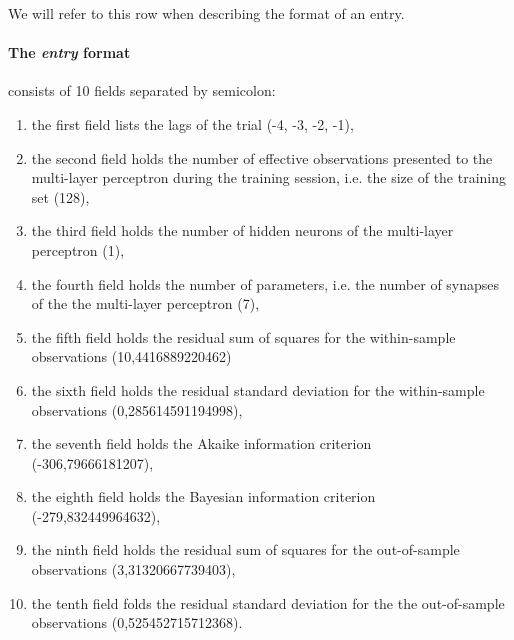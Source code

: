 \medskip

We will refer to this row when describing the format of an entry.

\paragraph{The \textit{entry} format} consists of 10 fields separated by semicolon:
\begin{enumerate}
\item the first field lists the lags of the trial (-4, -3, -2, -1),
\item the second field holds the number of effective observations presented to the multi-layer perceptron during the training session, i.e. the size of the training set (128),
\item the third field holds the number of hidden neurons of the multi-layer perceptron (1),
\item the fourth field holds the number of parameters, i.e. the number of synapses of the the multi-layer perceptron (7),
\item the fifth field holds the residual sum of squares for the within-sample observations (10,4416889220462)
\item the sixth field holds the residual standard deviation for the within-sample observations (0,285614591194998),
\item the seventh field holds the Akaike information criterion\\
(-306,79666181207),
\item the eighth field holds the Bayesian information criterion\\
(-279,832449964632),
\item the ninth field holds the residual sum of squares for the out-of-sample observations (3,31320667739403),
\item the tenth field folds the residual standard deviation for the the out-of-sample observations (0,525452715712368).
\end{enumerate}
